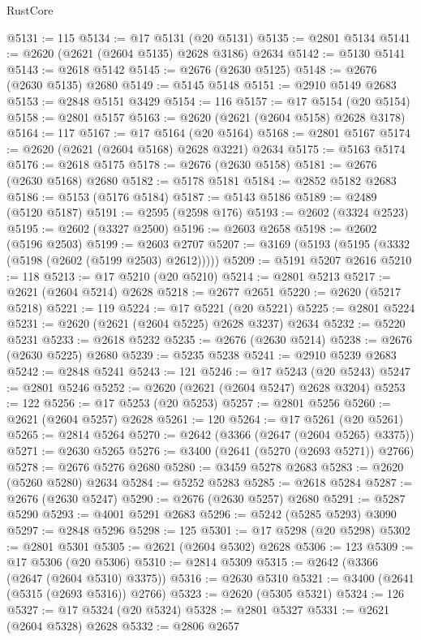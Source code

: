 \begin{lexlean}{RustCore}
\begin{coremodule}
@5131 := 115
@5134 := @17 @5131 (@20 @5131)
@5135 := @2801 @5134
@5141 := @2620 (@2621 (@2604 @5135) @2628 @3186) @2634
@5142 := @5130 @5141
@5143 := @2618 @5142
@5145 := @2676 (@2630 @5125)
@5148 := @2676 (@2630 @5135) @2680
@5149 := @5145 @5148
@5151 := @2910 @5149 @2683
@5153 := @2848 @5151 @3429
@5154 := 116
@5157 := @17 @5154 (@20 @5154)
@5158 := @2801 @5157
@5163 := @2620 (@2621 (@2604 @5158) @2628 @3178)
@5164 := 117
@5167 := @17 @5164 (@20 @5164)
@5168 := @2801 @5167
@5174 := @2620 (@2621 (@2604 @5168) @2628 @3221) @2634
@5175 := @5163 @5174
@5176 := @2618 @5175
@5178 := @2676 (@2630 @5158)
@5181 := @2676 (@2630 @5168) @2680
@5182 := @5178 @5181
@5184 := @2852 @5182 @2683
@5186 := @5153 (@5176 @5184)
@5187 := @5143 @5186
@5189 := @2489 (@5120 @5187)
@5191 := @2595 (@2598 @176)
@5193 := @2602 (@3324 @2523)
@5195 := @2602 (@3327 @2500)
@5196 := @2603 @2658
@5198 := @2602 (@5196 @2503)
@5199 := @2603 @2707
@5207 := @3169 (@5193 (@5195 (@3332 (@5198 (@2602 (@5199 @2503) @2612)))))
@5209 := @5191 @5207 @2616
@5210 := 118
@5213 := @17 @5210 (@20 @5210)
@5214 := @2801 @5213
@5217 := @2621 (@2604 @5214) @2628
@5218 := @2677 @2651
@5220 := @2620 (@5217 @5218)
@5221 := 119
@5224 := @17 @5221 (@20 @5221)
@5225 := @2801 @5224
@5231 := @2620 (@2621 (@2604 @5225) @2628 @3237) @2634
@5232 := @5220 @5231
@5233 := @2618 @5232
@5235 := @2676 (@2630 @5214)
@5238 := @2676 (@2630 @5225) @2680
@5239 := @5235 @5238
@5241 := @2910 @5239 @2683
@5242 := @2848 @5241
@5243 := 121
@5246 := @17 @5243 (@20 @5243)
@5247 := @2801 @5246
@5252 := @2620 (@2621 (@2604 @5247) @2628 @3204)
@5253 := 122
@5256 := @17 @5253 (@20 @5253)
@5257 := @2801 @5256
@5260 := @2621 (@2604 @5257) @2628
@5261 := 120
@5264 := @17 @5261 (@20 @5261)
@5265 := @2814 @5264
@5270 := @2642 (@3366 (@2647 (@2604 @5265) @3375))
@5271 := @2630 @5265
@5276 := @3400 (@2641 (@5270 (@2693 @5271)) @2766)
@5278 := @2676 @5276 @2680
@5280 := @3459 @5278 @2683
@5283 := @2620 (@5260 @5280) @2634
@5284 := @5252 @5283
@5285 := @2618 @5284
@5287 := @2676 (@2630 @5247)
@5290 := @2676 (@2630 @5257) @2680
@5291 := @5287 @5290
@5293 := @4001 @5291 @2683
@5296 := @5242 (@5285 @5293) @3090
@5297 := @2848 @5296
@5298 := 125
@5301 := @17 @5298 (@20 @5298)
@5302 := @2801 @5301
@5305 := @2621 (@2604 @5302) @2628
@5306 := 123
@5309 := @17 @5306 (@20 @5306)
@5310 := @2814 @5309
@5315 := @2642 (@3366 (@2647 (@2604 @5310) @3375))
@5316 := @2630 @5310
@5321 := @3400 (@2641 (@5315 (@2693 @5316)) @2766)
@5323 := @2620 (@5305 @5321)
@5324 := 126
@5327 := @17 @5324 (@20 @5324)
@5328 := @2801 @5327
@5331 := @2621 (@2604 @5328) @2628
@5332 := @2806 @2657

\end{coremodule}
\end{lexlean}
